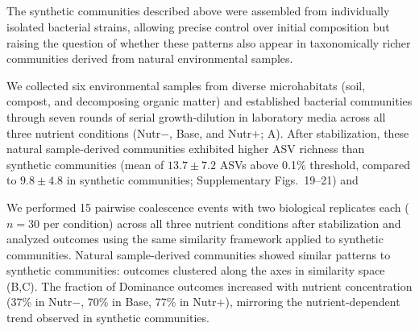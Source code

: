 \subsection{\texorpdfstring{}{Nutrient-dependent coalescence outcomes in natural sample-derived communities}}
\label{sec:results:natural_communities}

The synthetic communities described above were assembled from individually isolated bacterial strains, allowing precise control over initial composition but raising the question of whether these patterns also appear in taxonomically richer communities derived from natural environmental samples. 

We collected six environmental samples from diverse microhabitats (soil, compost, and decomposing organic matter) and established bacterial communities through seven rounds of serial growth-dilution in laboratory media across all three nutrient conditions (Nutr$-$, Base, and Nutr$+$; A). After stabilization, these natural sample-derived communities exhibited higher ASV richness than synthetic communities (mean of $13.7 \pm 7.2$ ASVs above 0.1\% threshold, compared to $9.8 \pm 4.8$ in synthetic communities; Supplementary Figs.~19--21) and 

We performed 15 pairwise coalescence events with two biological replicates each ($n = 30$ per condition) across all three nutrient conditions after stabilization and analyzed outcomes using the same similarity framework applied to synthetic communities. Natural sample-derived communities showed similar patterns to synthetic communities: outcomes clustered along the axes in similarity space (B,C). The fraction of Dominance outcomes increased with nutrient concentration (37\% in Nutr$-$, 70\% in Base, 77\% in Nutr$+$), mirroring the nutrient-dependent trend observed in synthetic communities. 


